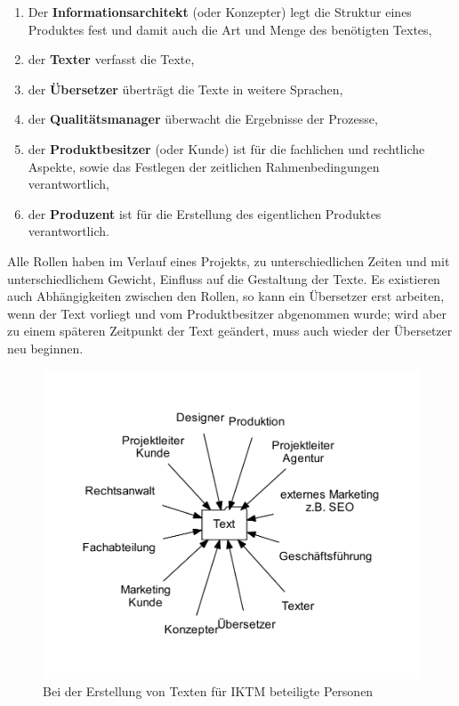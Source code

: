 \begin{enumerate}
\item{Der \textbf{Informationsarchitekt} (oder Konzepter) legt die Struktur eines Produktes fest und damit auch die Art und Menge des benötigten Textes,}
\item{der \textbf{Texter} verfasst die Texte,}
\item{der \textbf{Übersetzer} überträgt die Texte in weitere Sprachen,}
\item{der \textbf{Qualitätsmanager} überwacht die Ergebnisse der Prozesse,}
\item{der \textbf{Produktbesitzer} (oder Kunde) ist für die fachlichen und rechtliche Aspekte, sowie das Festlegen der zeitlichen Rahmenbedingungen verantwortlich,}
\item{der \textbf{Produzent} ist für die Erstellung des eigentlichen Produktes verantwortlich.}
\end{enumerate}

Alle Rollen haben im Verlauf eines Projekts, zu unterschiedlichen Zeiten und mit unterschiedlichem Gewicht, Einfluss auf die Gestaltung der Texte. Es existieren auch Abhängigkeiten zwischen den Rollen, so kann ein Übersetzer erst arbeiten, wenn der Text vorliegt und vom Produktbesitzer abgenommen wurde; wird aber zu einem späteren Zeitpunkt der Text geändert, muss auch wieder der Übersetzer neu beginnen.

\begin{figure}[htb]
\begin{center}
\includegraphics[width=\textwidth]{media/chart-2.pdf}
\end{center}
\caption{Bei der Erstellung von Texten für \ac{IKTM} beteiligte Personen}
\label{chart:2}
\end{figure}

